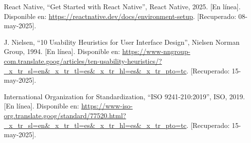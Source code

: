 \begin{thebibliography}{200}
    React Native, “Get Started with React Native”, React Native, 2025. [En línea]. Disponible en: \url{https://reactnative.dev/docs/environment-setup}. [Recuperado: 08-may-2025].

    J. Nielsen, “10 Usability Heuristics for User Interface Design”, Nielsen Norman Group, 1994. [En línea]. Disponible en: \url{https://www-nngroup-com.translate.goog/articles/ten-usability-heuristics/?_x_tr_sl=en&_x_tr_tl=es&_x_tr_hl=es&_x_tr_pto=tc}. [Recuperado: 15-may-2025].

    International Organization for Standardization, “ISO 9241-210:2019”, ISO, 2019. [En línea]. Disponible en: \url{https://www-iso-org.translate.goog/standard/77520.html?_x_tr_sl=en&_x_tr_tl=es&_x_tr_hl=es&_x_tr_pto=tc}. [Recuperado: 15-may-2025].
\end{thebibliography}
